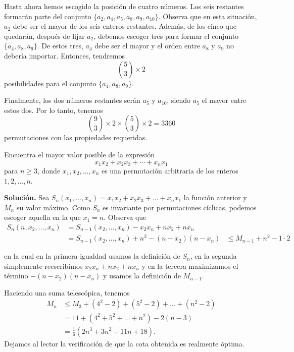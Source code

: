 \documentclass[11pt]{scrartcl}
\begin{document}
Hasta ahora hemos escogido la posición de cuatro números. Los seis restantes formarán parte del conjunto $\{a_2, a_4, a_5, a_8, a_9, a_{10}\}$. Observa que en esta situación, $a_2$ debe ser el mayor de los seis enteros restantes. Además, de los cinco que quedarán, después de fijar $a_2$, debemos escoger tres para formar el conjunto $\{a_4, a_8, a_9\}$. De estos tres, $a_4$ debe ser el mayor y el orden entre $a_8$ y $a_9$ no debería importar. Entonces, tendremos 
\[
\binom{5}{3} \times 2
\]
posibilidades para el conjunto $\{a_4, a_8, a_9\}$.

Finalmente, los dos números restantes serán $a_5$ y $a_{10}$, siendo $a_5$ el mayor entre estos dos. Por lo tanto, tenemos
\[
\binom{9}{3} \times 2 \times \binom{5}{3} \times 2 = 3360
\]
permutaciones con las propiedades requeridas.

\begin{example}
Encuentra el mayor valor posible de la expresión
\[
x_1x_2 + x_2x_3 + \cdots + x_nx_1
\]
para $n \geq 3$, donde $x_1, x_2, \dots, x_n$ es una permutación arbitraria de los enteros $1, 2, \dots, n$.
\end{example}
\textbf{Solución.} Sea $S_n(x_1, \dots, x_n) = x_1x_2 + x_2x_3 + \dots + x_nx_1$ la función anterior y $M_n$ su valor máximo. Como $S_n$ es invariante por permutaciones cíclicas, podemos escoger aquella en la que $x_1 = n$. Observa que
\begin{align*}
S_n(n, x_2, \dots, x_n) &= S_{n-1}(x_2, \dots, x_n) - x_2x_n + nx_2 + nx_n \\
&= S_{n-1}(x_2, \dots, x_n) + n^2 - (n - x_2)(n - x_n)
&\leq M_{n-1} + n^2 - 1 \cdot 2
\end{align*}

en la cual en la primera igualdad usamos la definición de $S_n$, en la segunda simplemente reescribimos $x_2x_n + nx_2 + nx_n$ y en la tercera maximizamos el término $-(n - x_2)(n - x_n)$ y usamos la definición de $M_{n-1}$.

Haciendo una suma telescópica, tenemos
\begin{align*}
M_n &\leq M_3 + (4^2 - 2) + (5^2 - 2) + \dots + (n^2 - 2) \\&= 11 + (4^2 + 5^2 + \dots + n^2) - 2(n - 3) \\&= \frac{1}{6}(2n^3 + 3n^2 - 11n + 18).
\end{align*}
Dejamos al lector la verificación de que la cota obtenida es realmente óptima.
\end{document}
